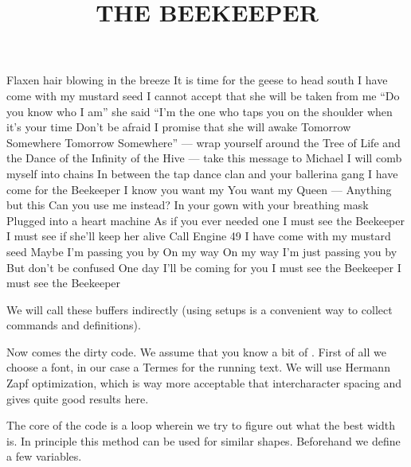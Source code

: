 \startbuffer[beekeeper]
\title {THE BEEKEEPER} Flaxen hair
blowing in the breeze It is time
for the geese to head south I have
come with my mustard seed I cannot
accept that she will be taken from me
``Do you know who I am'' she said ``I'm the
one who taps you on the shoulder when it's
your time Don't be afraid I promise that she
will awake Tomorrow Somewhere Tomorrow
Somewhere'' --- wrap yourself around the Tree of
Life and the Dance of the Infinity of the Hive --- take
this message to Michael I will comb myself into chains In
between the tap dance clan and your ballerina gang I have
come for the Beekeeper I know you want my You want
my Queen --- Anything but this Can you use me instead?
In your gown with your breathing mask Plugged into
a heart machine As if you ever needed one I must
see the Beekeeper I must see if she'll keep her
alive Call Engine 49 I have come with my
mustard seed Maybe I'm passing you by
On my way On my way I'm just passing
you by But don't be confused
One day I'll be coming for you \unknown\space
I must see the Beekeeper
I must see the Beekeeper
\stopbuffer
\stopbuffer

\typebuffer \getbuffer

We will call these buffers indirectly (using setups is a convenient way to
collect commands and definitions).

\startbuffer
\startsetups [beetext]
  \getbuffer[parasol]
\stopsetups
\stopbuffer

\typebuffer \getbuffer

Now comes the dirty code. We assume that you know a bit of \CONTEXT. First of all
we choose a font, in our case a Termes for the running text. We will use
Hermann Zapf optimization, which is way more acceptable that intercharacter
spacing and gives quite good results here.

\startbuffer
{}
\stopbuffer

\typebuffer \getbuffer

The core of the code is a loop wherein we try to figure out what the best width
is. In principle this method can be used for similar shapes. Beforehand we define
a few variables.

\startbuffer
{}

\newdimen\BeeEdge
\newdimen\BeeLine
\newdimen\BeeSize

\newbox  \BeeBox

\def\BeeLines{17}   %
\def\BeeStart{2cm}  %
\def\BeeStep {.5mm} %
\stopbuffer

